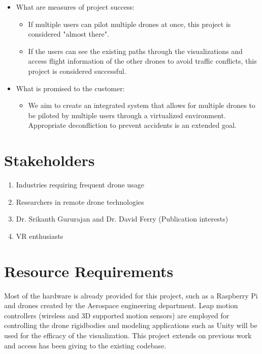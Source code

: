 \documentclass[paper=a4, fontsize=10pt]{scrartcl} %
\begin{document}
\begin{itemize}
	\setlength\itemsep{.25em}
	\item{What are measures of project success:}
		\begin{itemize}
			\setlength\itemsep{.25em}
			\item{If multiple users can pilot multiple drones at once, this project is considered "almost there".}
			\item{If the users can see the existing paths through the visualizations  and access flight information of the other drones to avoid traffic conflicts, this project is considered successful. }
		\end{itemize}
\end{itemize}
\begin{itemize}
	\setlength\itemsep{.25em}
	\item{What is promised to the customer: }
		\begin{itemize}
			\setlength\itemsep{.25em}
			\item{We aim to create an integrated system that allows for multiple drones to be piloted by multiple users through a virtualized environment. Appropriate deconfliction to prevent accidents is an extended goal. } 
		\end{itemize}
\end{itemize}

\section{Stakeholders}
\begin{enumerate}
	\setlength\itemsep{.25em}
	\item{Industries requiring frequent drone usage}
	\item{Researchers in remote drone technologies}
	\item{Dr. Srikanth Gururajan and Dr. David Ferry (Publication interests)}
	\item{VR enthusiasts}
\end{enumerate}

\section{Resource Requirements}
Most of the hardware is already provided for this project, such as a Raspberry Pi and drones created by the Aerospace engineering department.  Leap motion controllers (wireless and 3D supported motion sensors) are employed for controlling the drone rigidbodies and modeling applications such as Unity will be used for the efficacy of the visualization. This project extends on previous work and access has been giving to the existing codebase.
\end{document}
